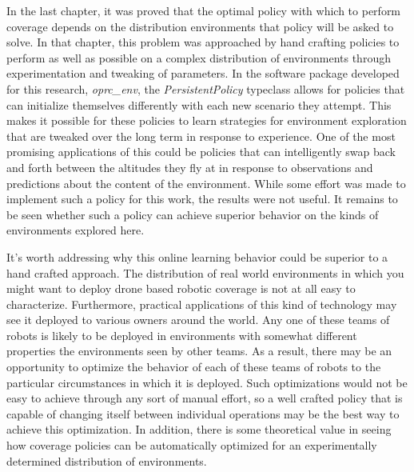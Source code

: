 In the last chapter, it was proved that the optimal policy with which to perform coverage depends on the distribution environments that policy will be asked to solve. In that chapter, this problem was approached by hand crafting policies to perform as well as possible on a complex distribution of environments through experimentation and tweaking of parameters. In the software package developed for this research, \textit{oprc\_env}, the \textit{PersistentPolicy} typeclass allows for policies that can initialize themselves differently with each new scenario they attempt. This makes it possible for these policies to learn strategies for environment exploration that are tweaked over the long term in response to experience. One of the most promising applications of this could be policies that can intelligently swap back and forth between the altitudes they fly at in response to observations and predictions about the content of the environment. While some effort was made to implement such a policy for this work, the results were not useful. It remains to be seen whether such a policy can achieve superior behavior on the kinds of environments explored here.


It's worth addressing why this online learning behavior could be superior to a hand crafted approach. The distribution of real world environments in which you might want to deploy drone based robotic coverage is not at all easy to characterize. Furthermore, practical applications of this kind of  technology may see it deployed to various owners around the world. Any one of these teams of robots is likely to be deployed in environments with somewhat different properties the environments seen by other teams. As a result, there may be an opportunity to optimize the behavior of each of these teams of robots to the particular circumstances in which it is deployed. Such optimizations would not be easy to achieve through any sort of manual effort, so a well crafted policy that is capable of changing itself between individual operations may be the best way to achieve this optimization. In addition, there is some theoretical value in seeing how coverage policies can be automatically optimized for an experimentally determined distribution of environments.